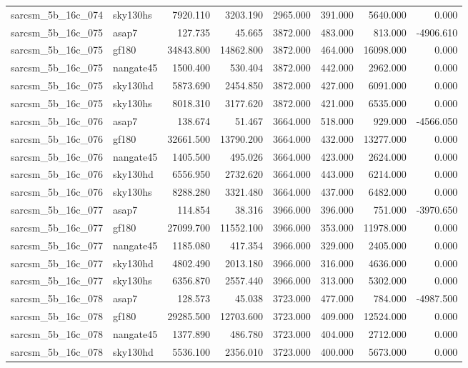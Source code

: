 \begin{tabular}{llrrrrrr}
sarcsm\_5b\_16c\_074 & sky130hs & 7920.110 & 3203.190 & 2965.000 & 391.000 & 5640.000 & 0.000 \\
sarcsm\_5b\_16c\_075 & asap7 & 127.735 & 45.665 & 3872.000 & 483.000 & 813.000 & -4906.610 \\
sarcsm\_5b\_16c\_075 & gf180 & 34843.800 & 14862.800 & 3872.000 & 464.000 & 16098.000 & 0.000 \\
sarcsm\_5b\_16c\_075 & nangate45 & 1500.400 & 530.404 & 3872.000 & 442.000 & 2962.000 & 0.000 \\
sarcsm\_5b\_16c\_075 & sky130hd & 5873.690 & 2454.850 & 3872.000 & 427.000 & 6091.000 & 0.000 \\
sarcsm\_5b\_16c\_075 & sky130hs & 8018.310 & 3177.620 & 3872.000 & 421.000 & 6535.000 & 0.000 \\
sarcsm\_5b\_16c\_076 & asap7 & 138.674 & 51.467 & 3664.000 & 518.000 & 929.000 & -4566.050 \\
sarcsm\_5b\_16c\_076 & gf180 & 32661.500 & 13790.200 & 3664.000 & 432.000 & 13277.000 & 0.000 \\
sarcsm\_5b\_16c\_076 & nangate45 & 1405.500 & 495.026 & 3664.000 & 423.000 & 2624.000 & 0.000 \\
sarcsm\_5b\_16c\_076 & sky130hd & 6556.950 & 2732.620 & 3664.000 & 443.000 & 6214.000 & 0.000 \\
sarcsm\_5b\_16c\_076 & sky130hs & 8288.280 & 3321.480 & 3664.000 & 437.000 & 6482.000 & 0.000 \\
sarcsm\_5b\_16c\_077 & asap7 & 114.854 & 38.316 & 3966.000 & 396.000 & 751.000 & -3970.650 \\
sarcsm\_5b\_16c\_077 & gf180 & 27099.700 & 11552.100 & 3966.000 & 353.000 & 11978.000 & 0.000 \\
sarcsm\_5b\_16c\_077 & nangate45 & 1185.080 & 417.354 & 3966.000 & 329.000 & 2405.000 & 0.000 \\
sarcsm\_5b\_16c\_077 & sky130hd & 4802.490 & 2013.180 & 3966.000 & 316.000 & 4636.000 & 0.000 \\
sarcsm\_5b\_16c\_077 & sky130hs & 6356.870 & 2557.440 & 3966.000 & 313.000 & 5302.000 & 0.000 \\
sarcsm\_5b\_16c\_078 & asap7 & 128.573 & 45.038 & 3723.000 & 477.000 & 784.000 & -4987.500 \\
sarcsm\_5b\_16c\_078 & gf180 & 29285.500 & 12703.600 & 3723.000 & 409.000 & 12524.000 & 0.000 \\
sarcsm\_5b\_16c\_078 & nangate45 & 1377.890 & 486.780 & 3723.000 & 404.000 & 2712.000 & 0.000 \\
sarcsm\_5b\_16c\_078 & sky130hd & 5536.100 & 2356.010 & 3723.000 & 400.000 & 5673.000 & 0.000 \\

\end{tabular}
